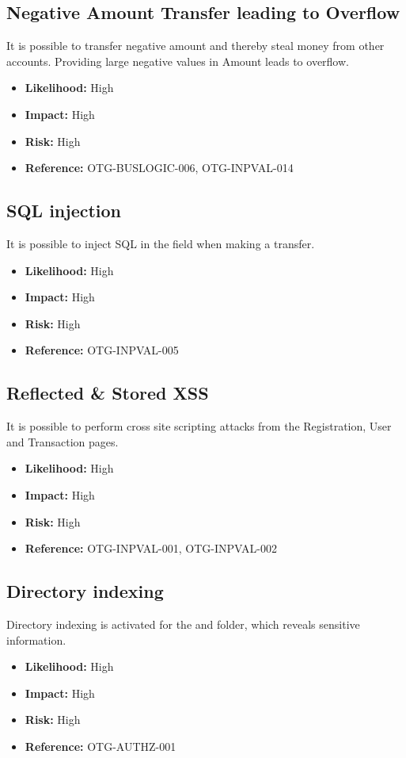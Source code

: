 \subsection{Negative Amount Transfer leading to Overflow}
It is possible to transfer negative amount and thereby steal money from other accounts.
Providing large negative values in Amount leads to overflow.
\begin{itemize}
	\item \textbf{Likelihood:} High
	\item \textbf{Impact:} High
	\item \textbf{Risk:} High
	\item \textbf{Reference:} OTG-BUSLOGIC-006, OTG-INPVAL-014
\end{itemize}

\subsection{SQL injection}
It is possible to inject SQL in the field  when making a transfer.
\begin{itemize}
	\item \textbf{Likelihood:} High
	\item \textbf{Impact:} High
	\item \textbf{Risk:} High
	\item \textbf{Reference:} OTG-INPVAL-005
\end{itemize}

\subsection{Reflected & Stored XSS}
It is possible to perform cross site scripting attacks from the Registration, User and Transaction pages.
\begin{itemize}
	\item \textbf{Likelihood:} High
	\item \textbf{Impact:} High
	\item \textbf{Risk:} High
	\item \textbf{Reference:} OTG-INPVAL-001, OTG-INPVAL-002
\end{itemize}

\subsection{Directory indexing}
Directory indexing is activated for the  and  folder, which reveals sensitive information.
\begin{itemize}
	\item \textbf{Likelihood:} High
	\item \textbf{Impact:} High
	\item \textbf{Risk:} High
	\item \textbf{Reference:} OTG-AUTHZ-001
\end{itemize}

